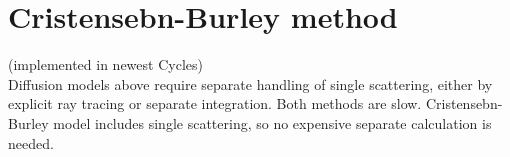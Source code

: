 \section{Cristensebn-Burley method}
(implemented in newest Cycles) \cite{Christensen:2015:ARP:2775280.2792555}\\
Diffusion models above require separate handling of single scattering, either by explicit ray tracing or separate integration.
Both methods are slow. Cristensebn-Burley model includes single scattering, so no
expensive separate calculation is needed.